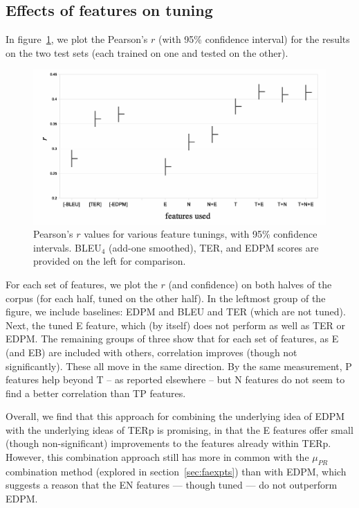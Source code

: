 \documentclass{kluwer}    %
\begin{document}
\begin{article}
\subsection{Effects of features on tuning}
In figure~\ref{fig:tuneresults}, we plot the Pearson's $r$ (with 95\%
confidence interval) for the results on the two test sets (each
trained on one and tested on the other).
\begin{figure}
  \begin{center}
    \includegraphics[scale=0.45]{tuning.eps}
  \end{center}
  \caption{Pearson's $r$ values for various feature tunings, with 95\%
    confidence intervals. BLEU$_4$ (add-one smoothed), TER, and EDPM
    scores are provided on the left for comparison.}
  \label{fig:tuneresults}
\end{figure}
%
For each set of features, we plot the $r$ (and confidence) on both
halves of the corpus (for each half, tuned on the other half). In the
leftmost group of the figure, we include baselines: EDPM and BLEU and
TER (which are not tuned).  Next, the tuned E feature, which (by
itself) does not perform as well as TER or EDPM.
%
The remaining groups of three show that for each set of features, as E
(and EB) are included with others, correlation improves (though not
significantly).  These all move in the same direction. By the same
measurement, P features help beyond T -- as reported elsewhere -- but
N features do not seem to find a better correlation than TP features.

Overall, we find that this approach for combining the underlying idea
of EDPM with the underlying ideas of TERp is promising, in that the E
features offer small (though non-significant) improvements to the
features already within TERp. However, this combination approach still
has more in common with the $\mu_{PR}$ combination method (explored in
section~\ref{sec:faexpts}) than with EDPM, which suggests a reason
that the EN features --- though tuned --- do not outperform EDPM.


\end{article}
\end{document}
